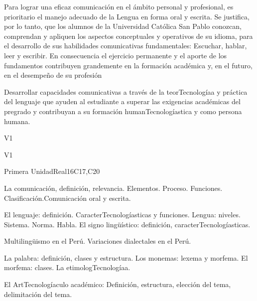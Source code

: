 \begin{syllabus}


\begin{justification}
Para lograr una eficaz comunicación en el ámbito personal y profesional, es prioritario el manejo adecuado de la Lengua en forma oral y escrita. Se justifica, por lo tanto, que los alumnos de la Universidad Católica San Pablo conozcan, comprendan y apliquen los aspectos conceptuales y operativos de su idioma, para el desarrollo de sus habilidades comunicativas fundamentales: Escuchar, hablar, leer y escribir.
En consecuencia el ejercicio permanente y el aporte de los fundamentos contribuyen grandemente en la formación académica y, en el futuro, en el desempeño de su profesión
\end{justification}

\begin{goals}
\item Desarrollar capacidades comunicativas a través de la teorTecnologíaa y práctica del lenguaje que ayuden al estudiante a superar las exigencias académicas del pregrado y contribuyan a su formación humanTecnologíastica y como persona humana.
\end{goals}

\begin{outcomes}{V1}
   \item {}
   \item {}
   \item {}
\end{outcomes}

\begin{competences}{V1}
    \item {}
    \item {}
    \item {}
\end{competences}

\begin{unit}{Primera Unidad}{}{Real}{16}{C17,C20}
\begin{topics}
      \item La comunicación, definición, relevancia. Elementos. Proceso. Funciones. Clasificación.Comunicación oral y escrita.
      \item El lenguaje: definición. CaracterTecnologíasticas y funciones. Lengua: niveles. Sistema. Norma. Habla. El signo lingüístico: definición, caracterTecnologíasticas.
      \item Multilingüismo en el Perú. Variaciones dialectales en el Perú.
      \item La palabra: definición, clases y estructura. Los monemas: lexema y morfema. El morfema: clases. La etimologTecnologíaa.
      \item El ArtTecnologíaculo académico: Definición, estructura, elección del tema, delimitación del tema.
\end{topics}


\end{unit}
\end{syllabus}
